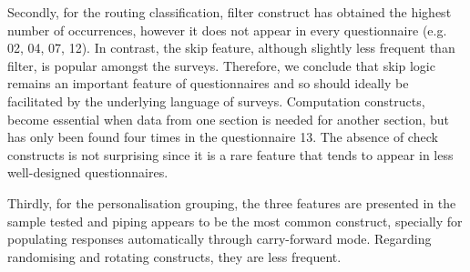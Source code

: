 	Secondly, for the routing classification, filter construct has obtained the highest number of occurrences, however it does not appear in every questionnaire (e.g. 02, 04, 07, 12). In contrast, the skip feature, although slightly less frequent than filter, is popular amongst the surveys. Therefore, we conclude that skip logic remains an important feature of questionnaires and so should ideally be facilitated by the underlying language of surveys. Computation constructs, become essential when data from one section is needed for another section, but has only been found four times in the questionnaire 13. The absence of check constructs is not surprising since it is a rare feature that tends to appear in less well-designed questionnaires.

	Thirdly, for the personalisation grouping, the three features are presented in the sample tested and piping appears to be the most common construct, specially for populating responses automatically through carry-forward mode. Regarding randomising and rotating constructs, they are less frequent.